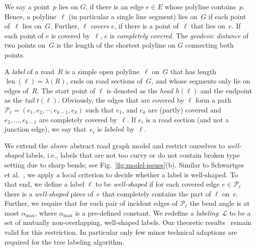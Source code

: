 \documentclass[a4paper,11pt]{article}
\DeclareMathOperator{\length}{len}
\begin{document}
We say a point~$p$ lies on $G$, if there is an edge $e\in E$ whose
polyline contains~$p$. Hence, a polyline~$\ell$ (in particular a
single line segment) lies on~$G$ if each point of~$\ell$ lies
on~$G$. Further, $\ell$ \emph{covers} $e$, if there is a point
of~$\ell$ that lies on~$e$. If each point of $e$ is covered by~$\ell$,
$e$ is \emph{completely covered}.  The \emph{geodesic distance} of two points
on~$G$ is the length of the shortest polyline on $G$ connecting both
points.

A \emph{label} of a road~$R$ is a simple open polyline~$\ell$ on~$G$
that has length~$\length(\ell) = \lambda(R)$, ends on road sections
of~$G$, and whose segments only lie on edges of~$R$.  The start point
of $\ell$ is denoted as the \emph{head} $h(\ell)$ and the endpoint as
the \emph{tail} $t(\ell)$.  Obviously, the edges that are covered by
$\ell$ form a path~$\mathcal P_{\ell}=(e_1,e_2,\cdots,e_{k-1},e_k)$
such that $e_1$, and $e_k$ are (partly) covered and
$e_2,\dots,e_{k-1}$ are completely covered by~$\ell$. If $e_i$ is a road section (and not a junction
edge), we say that~$e_i$ is \emph{labeled}~by~$\ell$.


We extend the above abstract road graph model and restrict ourselves to \emph{well-shaped} labels, i.e., labels that are not too curvy or do not contain broken type setting due to sharp bends; see Fig.~\ref{fig:model-issues}(b). Similar to
  Schwartges et al.~\cite{swh-lsime-acm14}, we apply a local criterion
  to decide whether a label is well-shaped.
To that end, we define a label $\ell$ to be \emph{well-shaped} if for each covered
edge $e\in \mathcal P_\ell$ there is a \emph{well-shaped} piece of~$e$
that completely contains the part of $\ell$ on~$e$.  Further, we
require that for each pair of incident edges of $\mathcal P_\ell$ the
bend angle is at most $\alpha_\text{max}$, where $\alpha_\text{max}$
is a pre-defined constant. We redefine a \emph{labeling}~$\mathcal L$
to be a set of mutually non-overlapping, well-shaped labels.
Our theoretic results~\cite{rlTheory} remain valid for this
restriction. In particular only few minor technical adaptions are required for the tree labeling algorithm.
\end{document}
